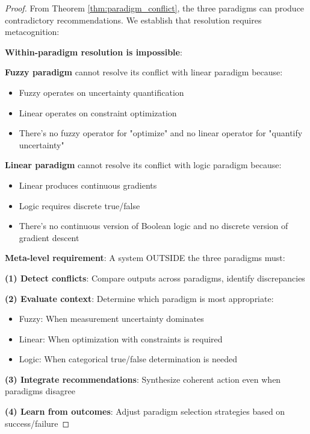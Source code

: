 \begin{proof}
From Theorem \ref{thm:paradigm_conflict}, the three paradigms can produce contradictory recommendations. We establish that resolution requires metacognition:

\textbf{Within-paradigm resolution is impossible}:

\textbf{Fuzzy paradigm} cannot resolve its conflict with linear paradigm because:
\begin{itemize}
\item Fuzzy operates on uncertainty quantification
\item Linear operates on constraint optimization
\item There's no fuzzy operator for "optimize" and no linear operator for "quantify uncertainty"
\end{itemize}

\textbf{Linear paradigm} cannot resolve its conflict with logic paradigm because:
\begin{itemize}
\item Linear produces continuous gradients
\item Logic requires discrete true/false
\item There's no continuous version of Boolean logic and no discrete version of gradient descent
\end{itemize}

\textbf{Meta-level requirement}: A system OUTSIDE the three paradigms must:

\textbf{(1) Detect conflicts}: Compare outputs across paradigms, identify discrepancies

\textbf{(2) Evaluate context}: Determine which paradigm is most appropriate:
\begin{itemize}
\item Fuzzy: When measurement uncertainty dominates
\item Linear: When optimization with constraints is required
\item Logic: When categorical true/false determination is needed
\end{itemize}

\textbf{(3) Integrate recommendations}: Synthesize coherent action even when paradigms disagree

\textbf{(4) Learn from outcomes}: Adjust paradigm selection strategies based on success/failure


\end{proof}
